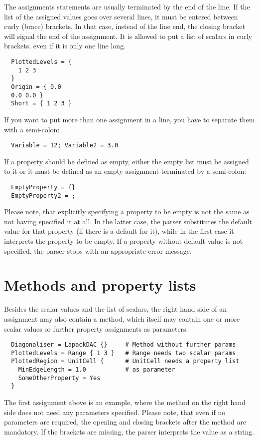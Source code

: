 The assignments statements are usually terminated by the end of the
line.  If the list of the assigned values goes over several lines, it
must be entered between curly (brace) brackets. In that case, instead
of the line end, the closing bracket will signal the end of the
assignment.  It is allowed to put a list of scalars in curly brackets,
even if it is only one line long.
\begin{verbatim}
  PlottedLevels = {
    1 2 3
  }
  Origin = { 0.0
  0.0 0.0 }
  Short = { 1 2 3 }
\end{verbatim}

If you want to put more than one assignment in a line, you have to
separate them with a semi-colon:
\begin{verbatim}
  Variable = 12; Variable2 = 3.0
\end{verbatim}

If a property should be defined as empty, either the empty list must be
assigned to it or it must be defined as an empty assignment
terminated by a semi-colon:
\begin{verbatim}
  EmptyProperty = {}
  EmptyProperty2 = ;
\end{verbatim}

Please note, that explicitly specifying a property to be empty is not
the same as not having specified it at all. In the latter case, the
parser substitutes the default value for that property (if there is a
default for it), while in the first case it interprets the property to
be empty. If a property without default value is not specified, the
parser stops with an appropriate error message.


\section{Methods and property lists}

Besides the scalar values and the list of scalars, the right hand side
of an assignment may also contain a method, which itself may contain
one or more scalar values or further property assignments as
parameters:
\begin{verbatim}
  Diagonaliser = LapackDAC {}     # Method without further params
  PlottedLevels = Range { 1 3 }   # Range needs two scalar params
  PlottedRegion = UnitCell {      # UnitCell needs a property list
    MinEdgeLength = 1.0           # as parameter
    SomeOtherProperty = Yes
  }
\end{verbatim}
The first assignment above is an example, where the method on the
right hand side does not need any parameters specified. Please note,
that even if no parameters are required, the opening and closing
brackets after the method are mandatory. If the brackets are missing,
the parser interprets the value as a string.

